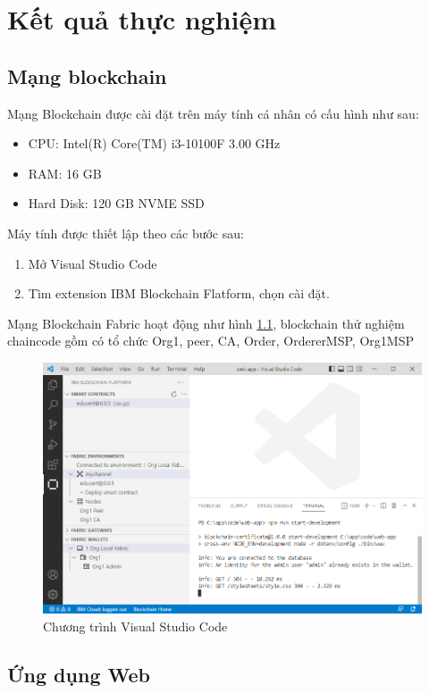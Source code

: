 \chapter{Kết quả thực nghiệm}
\section{Mạng blockchain}

Mạng Blockchain được cài đặt  trên máy tính cá nhân có cấu hình như sau:
\begin{itemize}
\item CPU: Intel(R) Core(TM) i3-10100F 3.00 GHz
\item RAM: 16 GB
\item Hard Disk: 120 GB NVME SSD
\end{itemize}

Máy tính được thiết lập theo các bước sau:
\begin{enumerate}
\item Mở Visual Studio Code 
\item Tìm extension IBM Blockchain Flatform, chọn cài đặt.
\end{enumerate}
Mạng Blockchain Fabric hoạt động như hình \ref{fig:ide_start}, blockchain thử nghiệm chaincode gồm có tổ chức Org1, peer, CA, Order, OrdererMSP, Org1MSP

\begin{figure}[htbp]
\centering
\includegraphics[width=.9\linewidth]{img/ide_start.PNG}
\caption{Chương trình Visual Studio Code}
\label{fig:ide_start}
\end{figure}

\section{Ứng dụng Web}


